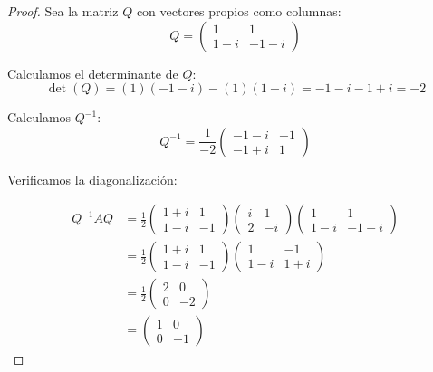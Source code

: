 \documentclass[11pt]{article}
\begin{document}
\begin{proof}
Sea la matriz $Q$ con vectores propios como columnas:
\[
Q = \begin{pmatrix} 1 & 1 \\ 1-i & -1-i \end{pmatrix}
\]

Calculamos el determinante de $Q$:
\[
\det(Q) = (1)(-1-i) - (1)(1-i) = -1-i -1 + i = -2
\]

Calculamos $Q^{-1}$:
\[
Q^{-1} = \frac{1}{-2} \begin{pmatrix} -1-i & -1 \\ -1+i & 1 \end{pmatrix}
\]

Verificamos la diagonalización:

\begin{align*}
    Q^{-1}AQ &= \frac{1}{2}\begin{pmatrix} 1 + i & 1 \\ 1-i & -1 \end{pmatrix} 
    \begin{pmatrix} i& 1 \\ 2 &-i \end{pmatrix}\begin{pmatrix} 1 & 1 \\ 1-i & -1-i \end{pmatrix} \\
    &=\frac{1}{2}\begin{pmatrix} 1 + i & 1 \\ 1-i & -1 \end{pmatrix}
     \begin{pmatrix} 1& -1 \\ 1-i &1+i \end{pmatrix} \\
    &=\frac{1}{2}\begin{pmatrix} 2 & 0 \\ 0 & -2 \end{pmatrix} \\
    &=\begin{pmatrix} 1 & 0 \\ 0 & -1 \end{pmatrix}
\end{align*}
\end{proof}
\end{document}
